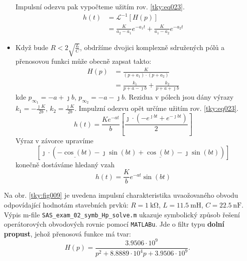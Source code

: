 \begin{mdframed}[style=mdexam]
\begin{example}
\begin{itemize}[leftmargin=12pt,noitemsep]
\begin{equation*}
            \end{equation*}
            Impulsní odezvu pak vypočteme užitím rov. \ref{tky:eq023}.
            \begin{align*}
              h(t)&=\mathcal{L}^{-1}[H(p)]               \\
                  &=\frac{K}{a_2-a_1}e^{-a_1t}+\frac{K}{a_1-a_2}e^{-a_2t}
            \end{align*}
      \item Když bude $R<2\sqrt{\frac{L}{C}}$, obdržíme dvojici komplexně sdružených pólů a
            přenosovou funkci může obecně zapsat takto:
            \begin{align*}
              H(p)&=\frac{K}{(p+a_1)\cdot(p+a_2)}            \\
                  &=\frac{k_1}{p+a-\jmath b}+\frac{k_2}{p+a+\jmath b}
            \end{align*}
            kde $p_{\infty_1}=-a+\jmath b$, $p_{\infty_2}=-a-\jmath b$. Rezidua v pólech jsou dány
            výrazy $k_1=-\frac{\jmath K}{2b}$, $k_2=\frac{\jmath K}{2b}$. Impulzní odezvu opět
            určíme užitím rov. \ref{tky:eq023}.
            \begin{equation*}
              h(t) = \frac{Ke^{-at}}{b}
                     \left[\dfrac{\jmath\cdot\left(-e^{\jmath bt}+e^{-\jmath bt}\right)}{2}\right]
            \end{equation*}
            Výraz v závorce upravíme
            \begin{equation*}
              \left[\jmath\cdot\left(\underline{-\cos(bt)}-\jmath\sin(bt) + 
                                     \underline{\cos(bt)} -\jmath\sin(bt)
                               \right)
              \right]                                                     
            \end{equation*}
            konečně dostáváme hledaný vzah
            \begin{equation*}              
              h(t) = \frac{K}{b}e^{-at}\sin(bt)                                   
            \end{equation*}
    \end{itemize}
    
    Na obr. \ref{tky:fig009} je uvedena impulsní charakteristika uvaožovaného obvodu odpovídající
    hodnotám stavebních prvků: \(R=\SI{1}{\kohm}\), \(L=\SI{11.5}{\milli\henry}\),
    \(C=\SI{22.5}{\nano\farad}\). Výpis m-file \texttt{SAS\_exam\_02\_symb\_Hp\_solve.m} ukazuje
    symbolický způsob řešení operátorových obvodových rovnic pomocí \texttt{MATLABu}. Jde o filtr
    typu \textbf{dolní propust}, jehož přenosová funkce má tvar:
    $$H(p)= \frac{3.9506\cdot10^9}{p^2+8.8889\cdot10^4p+3.9506\cdot10^9}.$$


\end{example}
\end{mdframed}
